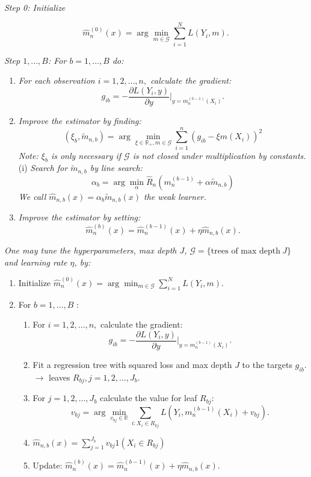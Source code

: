\documentclass[a4paper,12pt,openany]{book}
\providecommand{\tightlist}{%
 \setlength{\itemsep}{0pt}\setlength{\parskip}{0pt}}
\begin{document}
\emph{Step 0: Initialize}

\[
\hat m_{n}^{(0)}(x)=\arg \min_{m \in \mathcal G} \sum_{i=1}^N L\left(Y_i, m\right).
\]

\emph{Step \(1,..., B\): For \(b=1,\dots,B\) do:}

\begin{enumerate}
\def\labelenumi{(\alph{enumi})}
\tightlist
\item
  \emph{For each observation \(i=1,2, \ldots, n,\) calculate the gradient:}
  \[g_{ib}=-\frac{\partial L(Y_i,y)}{\partial y} \Bigr\rvert_{y=m_n^{(b-1)}(X_i)}.\]
\item
  \emph{Improve the estimator by finding:}
  \[(\xi_b, \tilde m_{n,b})= \arg \min_{\xi\in \mathbb R_+,m \in \mathcal G}\sum_{i=1}^n(g_{ib}-\xi m(X_i))^2\]
  \emph{Note: \(\xi_b\) is only necessary if \(\mathcal G\) is not closed under multiplication by constants.}
  (i) \emph{Search for \(\tilde m_{n,b}\) by line search:}
  \[\alpha_b= \arg \min_{\alpha} \hat R_n(m_n^{(b-1)}+\alpha \tilde  m_{n,b})\]
  \emph{We call \(\hat m_{n,b}(x)= \alpha_b \tilde m_{n,b}(x)\) the weak learner.}
\item
  \emph{Improve the estimator by setting:}
  \[\hat m^{(b)}_n(x)=\hat m^{(b-1)}_n(x)+\eta \hat m_{n,b}(x).\]
\end{enumerate}

\emph{One may tune the hyperparameters, max depth \(J\), \(\mathcal G=\{\text{trees of max depth} \ J\}\) and learning rate \(\eta\), by:}

\begin{enumerate}
\def\labelenumi{\arabic{enumi}.}
\tightlist
\item
  Initialize \(\hat m_{n}^{(0)}(x)=\arg \min_{m \in \mathcal G} \sum_{i=1}^N L\left(Y_i, m\right)\).
\item
  For \(b=1,\dots,B\) :

  \begin{enumerate}
  \def\labelenumii{(\alph{enumii})}
  \tightlist
  \item
    For \(i=1,2, \ldots, n,\) calculate the gradient:
    \[
    g_{ib}=-\frac{\partial L(Y_i,y)}{\partial y} \Bigr\rvert_{y=m_n^{(b-1)}(X_i)} .
    \]
  \item
    Fit a regression tree with squared loss and max depth \(J\) to the targets \(g_{ib}\). \(\rightarrow\) leaves \(R_{bj}, j=1,2, \ldots, J_b\).
  \item
    For \(j=1,2, \ldots, J_b\) calculate the value for leaf \(R_{bj}\):
    \[
    v_{bj}=\arg \min_{ v_{bj} \in \mathbb R} \sum_{i: X_i \in R_{kj}} L\left(Y_i, m_n^{(b-1)}(X_i)+ v_{bj}\right) .
    \]
  \item
    \(\hat m_{n,b}(x)=\sum_{j=1}^{J_b} v_{bj} 1\left(X_i \in R_{b j}\right)\)
  \item
    Update: \(\hat m^{(b)}_n(x)=\hat m^{(b-1)}_n(x)+ \eta \hat m_{n,b}(x)\).
  \end{enumerate}
\end{enumerate}
\end{document}
